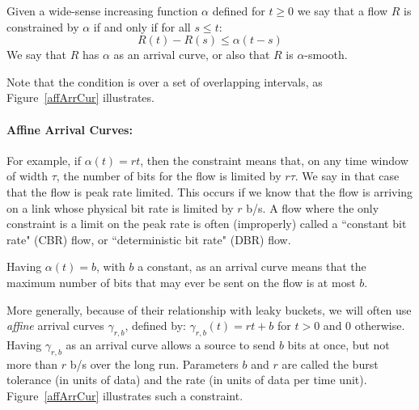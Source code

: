 \begin{definition} 
Given a wide-sense increasing function $\alpha$ defined for $t
\geq 0$ we say that a flow $R$ is constrained by $\alpha$ if and
only if for all $s \leq t$:
$$R(t)-R(s) \leq \alpha(t-s)$$
We say that $R$ has $\alpha$ as an arrival curve, or also that $R$
is $\alpha$-smooth.%
%
\end{definition}
Note that the condition is over a set of overlapping intervals, as
Figure~\ref{affArrCur} illustrates.
\begin{figure}[!htbp]
\end{figure}

\paragraph{Affine Arrival Curves: }
For example, if $\alpha(t)=rt$, then the constraint means that, on
any time window of width $\tau$, the number of bits for the flow
is limited by $r \tau$. We say in that case that the flow is peak
rate limited. This occurs if we know that the flow is arriving on
a link whose physical bit rate is limited by $r$ b/s. A flow where
the only constraint is a limit on the peak rate is often
(improperly) called a ``constant bit rate" (CBR) flow, or
``deterministic bit rate" (DBR) flow.

Having $\alpha(t)=b$, with $b$ a constant, as an arrival curve
means that the maximum number of bits that may ever be sent on the
flow is at most $b$.

More generally, because of their relationship with leaky buckets,
we will often use \emph{affine} arrival curves $\gamma_{r,b}$,
defined by:
$\gamma_{r,b}(t)=rt +b$ for $t>0$ and $0$ otherwise. Having
$\gamma_{r,b}$ as an arrival curve allows a source to send $b$
bits at once, but not more than $r$ b/s over the long run.
Parameters $b$ and $r$ are called the burst tolerance (in units of
data) and the rate (in units of data per time unit).
Figure~\ref{affArrCur} illustrates such a constraint.
